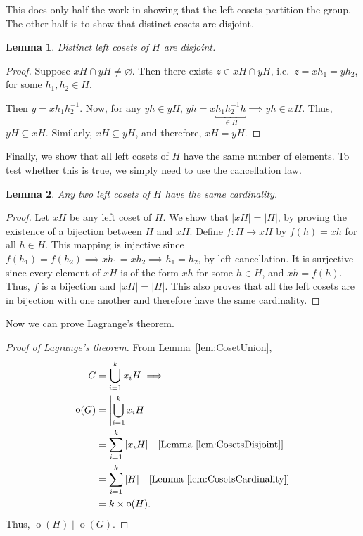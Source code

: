 \documentclass[svgnames]{article}
\newtheorem{Lemma}[Lemma]{Lemma}
\theoremstyle{definition}
\theoremstyle{remark}
\DeclareMathOperator{\ord}{o}
\begin{document}
This does only half the work in showing that the left cosets partition the group. The other half is to show that distinct cosets are disjoint.
\begin{Lemma}\label{lem:CosetsDisjoint}
Distinct left cosets of $H$ are disjoint.
\end{Lemma}

\begin{proof}
Suppose $xH \cap yH \ne \varnothing$. Then there exists $z \in xH \cap yH$, i.e.\ $z = xh_1 = yh_2$, for some $h_1, h_2 \in H$.

Then $y = xh_1 h_2^{-1}$. Now, for any $yh \in yH$, $yh = x \underbracket{h_1h_2^{-1}h}_{\in H} \implies yh \in xH$. Thus, $yH \subseteq xH$. Similarly, $xH \subseteq yH$, and therefore, $xH = yH$.
\end{proof}

Finally, we show that all left cosets of $H$ have the same number of elements. To test whether this is true, we simply need to use the cancellation law.

\begin{Lemma}\label{lem:CosetsCardinality}
Any two left cosets of $H$ have the same cardinality.
\end{Lemma}

\begin{proof}
Let $xH$ be any left coset of $H$. We show that $|xH| = |H|$, by proving the existence of a bijection between $H$ and $xH$. Define $f \colon H \to xH$ by $f(h) = xh$ for all $h \in H$. This mapping is injective since $f(h_1) = f(h_2) \implies xh_1 = xh_2 \implies h_1 = h_2$, by left cancellation. It is surjective since every element of $xH$ is of the form $xh$ for some $h \in H$, and $xh = f(h)$. Thus, $f$ is a bijection and $|xH| = |H|$. This also proves that all the left cosets are in bijection with one another and therefore have the same cardinality.
\end{proof}

Now we can prove Lagrange's theorem.
\begin{proof}[Proof of Lagrange's theorem]
From Lemma~\ref{lem:CosetUnion},
\begin{align*}
G &= \bigcup_{i = 1}^k x_i H \implies \\
\ord(G) &= \left| \bigcup_{i = 1}^k x_i H \right| \\
	&= \sum_{i = 1}^k |x_i H| \quad \text{[Lemma~\ref{lem:CosetsDisjoint}]} \\
	& = \sum_{i = 1}^k |H| \quad \text{[Lemma~\ref{lem:CosetsCardinality}]} \\
	& = k \times \ord(H).
\end{align*}
Thus, $\ord(H) \mid \ord(G)$.
\end{proof}
\end{document}
